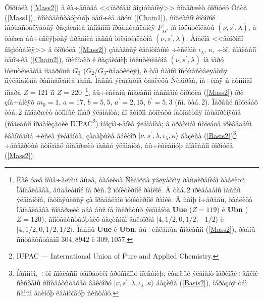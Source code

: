 Ôîðìóëà (\ref{Mass2}) â êà÷åñòâå <<ïåðâîãî âîçìóùåíèÿ>> ñîäåðæèò ôîðìóëó Ôåòà (\ref{Mass1}), ñîîòâåòñòâóþùóþ öåïî÷êå ãðóïï (\ref{Chain1}), ñîãëàñíî êîòîðîé îñóùåñòâëÿåòñÿ ðàçáèåíèå îñíîâíîãî ïðåäñòàâëåíèÿ $F^+_{ss^\prime}$ íà ìóëüòèïëåòû $(\nu,s^\prime,\lambda)$, à òàêæå âû÷èñëÿþòñÿ ñðåäíèå ìàññû ìóëüòèïëåòîâ $(\nu,s^\prime,\lambda)$. Àíàëîã <<âòîðîãî âîçìóùåíèÿ>> â ôîðìóëå (\ref{Mass2}) çàäàžòñÿ êâàíòîâûìè ÷èñëàìè $\iota_\lambda$, $\kappa$, ÷òî, ñîãëàñíî öåïî÷êå (\ref{Chain2}), ïðèâîäèò ê ðàçáèåíèþ ìóëüòèïëåòîâ $(\nu,s^\prime,\lambda)$ íà ïàðó ìóëüòèïëåòîâ ïîäãðóïïû $G_3$ ($G_2/G_3$-ðåäóêöèÿ), è òåì ñàìûì îñóùåñòâëÿåòñÿ ïîýëåìåíòíîå ðàñùåïëåíèå ìàññ. Ìàññû ýëåìåíòîâ òàáëèöû Ñèáîðãà, íà÷èíàÿ ñ àòîìíîãî íîìåðà $Z=121$ ïî $Z=220$~\footnote{Êàê óæå îòìå÷àëîñü âûøå, òàáëèöà Ñèáîðãà ÿâëÿåòñÿ ðàñøèðåíèåì òàáëèöû Ìåíäåëååâà, âûäåëåííîé íà ðèñ.\,2 ïóíêòèðíîé ðàìêîé. Â òàá.\,2 ïðèâåäåíû ìàññû ýëåìåíòîâ, íàõîäÿùèõñÿ çà ïðåäåëàìè ïóíêòèðíîé ðàìêè. Â ñâîþ î÷åðåäü, òàáëèöà Ìåíäåëååâà ñîäåðæèò äâà åùž íå îòêðûòûõ ýëåìåíòà \textbf{Uue} ($Z=119$) è \textbf{Ubn} ($Z=120$), ñîîòâåòñòâóþùèõ áàçèñíûì âåêòîðàì $|4,1/2,0,1/2,-1/2\rangle$ è $|4,1/2,0,1/2,1/2\rangle$. Ìàññû \textbf{Uue} è \textbf{Ubn}, âû÷èñëåííûå ñîãëàñíî (\ref{Mass2}), ðàâíû ñîîòâåòñòâåííî $304{,}8942$ è $309{,}1057$.}, âû÷èñëåíû ñîãëàñíî ìàññîâîé ôîðìóëå (\ref{Mass2}) ïðè çíà÷åíèÿõ $m_0=1$, $a=17$, $b=5{,}5$, $a^\prime=2{,}15$, $b^\prime=5{,}3$ (ñì. òàá.\,2). Ïåðâûé ñòîëáåö òàá.\,2 ñîäåðæèò àòîìíûé íîìåð ýëåìåíòà; âî âòîðîì ñòîëáöå íàõîäèòñÿ îáùåïðèíÿòîå (ñîãëàñíî îðãàíèçàöèè IUPAC\footnote{IUPAC --- International Union of Pure and Applied Chemistry.}) îáîçíà÷åíèå ýëåìåíòà; â òðåòüåì ñòîëáöå ïðèâåäåíû êâàíòîâûå ÷èñëà ýëåìåíòà, çàäàþùèå âåêòîð $|\nu,s^\prime,\lambda,\iota_\lambda,\kappa\rangle$ áàçèñà (\ref{Basis2})\footnote{Íàïîìíèì, ÷òî ñîãëàñíî òåîðåòèêî-ãðóïïîâîìó îïèñàíèþ, êàæäûé ýëåìåíò ïåðèîäè÷åñêîé ñèñòåìû ñîîòâåòñòâóåò âåêòîðó $|\nu,s^\prime,\lambda,\iota_\lambda,\kappa\rangle$ áàçèñà (\ref{Basis2}), îáðàçóÿ òåì ñàìûì åäèíóþ êâàíòîâóþ ñèñòåìó.}; ÷åòâžðòûé ñòîëáåö ñîäåðæèò ìàññó ýëåìåíòà, âû÷èñëåííóþ ñîãëàñíî ôîðìóëå (\ref{Mass2}).
